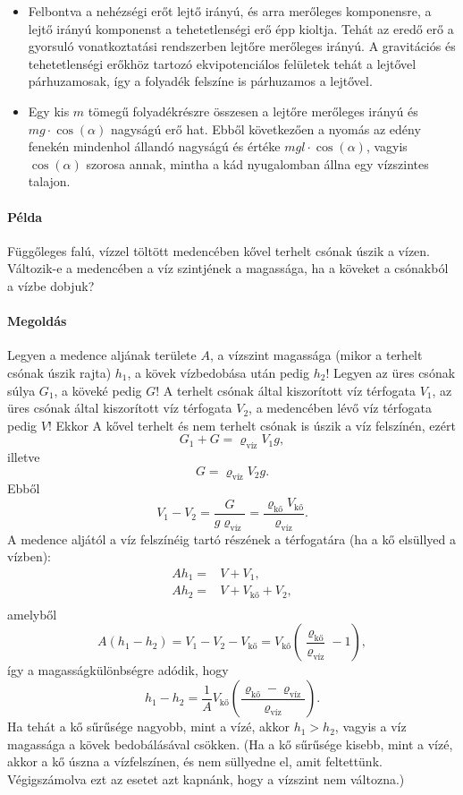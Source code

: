 \documentclass[12pt,a4paper]{scrartcl}
\begin{document}
\begin{itemize}
\item Felbontva a nehézségi erőt lejtő irányú, és arra merőleges komponensre, a lejtő irányú komponenst a tehetetlenségi erő épp kioltja. Tehát az eredő erő a gyorsuló vonatkoztatási rendszerben lejtőre merőleges irányú. A gravitációs és tehetetlenségi erőkhöz tartozó ekvipotenciálos felületek tehát a lejtővel párhuzamosak, így a folyadék felszíne is párhuzamos a lejtővel. 
\item Egy kis $m$ tömegű folyadékrészre összesen a lejtőre merőleges irányú és $mg \cdot \cos \left( \alpha  \right)$ nagyságú erő hat. Ebből következően a nyomás az edény fenekén mindenhol állandó nagyságú és értéke $mgl \cdot \cos \left( \alpha  \right)$, vagyis $\cos \left( \alpha  \right)$ szorosa annak, mintha a kád nyugalomban állna egy vízszintes talajon.
\end{itemize}

\paragraph{Példa}
Függőleges falú, vízzel töltött medencében kővel terhelt csónak úszik a vízen. Változik-e a medencében a víz szintjének a magassága, ha a köveket a csónakból a vízbe dobjuk?

\paragraph{Megoldás}
Legyen a medence aljának területe $A$, a vízszint magassága (mikor a terhelt csónak úszik rajta) $h_1$, a kövek vízbedobása után pedig $h_2$! Legyen az üres csónak súlya $G_1$, a köveké pedig $G$! A terhelt csónak által kiszorított víz térfogata $V_1$, az üres csónak által kiszorított víz térfogata $V_2$, a medencében lévő víz térfogata pedig $V$! Ekkor
A kővel terhelt és nem terhelt csónak is úszik a víz felszínén, ezért
\[{G_1} + G = {\varrho _{\text{víz}}}{V_1}g,\]
illetve
\[G = {\varrho _{\text{víz}}}{V_2}g.\]
Ebből
\[{V_1} - {V_2} = \frac{G}{{g{\varrho _{\text{víz}}}}} = \frac{{{\varrho _{\text{kő}}}{V_{\text{kő}}}}}{{{\varrho _{\text{víz}}}}}.\]
A medence aljától a víz felszínéig tartó részének a térfogatára (ha a kő elsüllyed a vízben):
\[\begin{aligned}
  A{h_1} =  & V + {V_1}, \\ 
  A{h_2} =  & V + {V_{{\text{kő}}}} + {V_2}, \\ 
\end{aligned} \]
amelyből
\[A\left( {{h_1} - {h_2}} \right) = {V_1} - {V_2} - {V_{{\text{kő}}}} = {V_{{\text{kő}}}}\left( {\frac{{{\varrho _{{\text{kő}}}}}}{{{\varrho _{{\text{víz}}}}}} - 1} \right),\]
így a magasságkülönbségre adódik, hogy
\[{h_1} - {h_2} = \frac{1}{A}{V_{{\text{kő}}}}\left( {\frac{{{\varrho _{{\text{kő}}}} - {\varrho _{{\text{víz}}}}}}{{{\varrho _{{\text{víz}}}}}}} \right).\]
Ha tehát a kő sűrűsége nagyobb, mint a vízé, akkor $h_1 > h_2$, vagyis a víz magassága a kövek bedobálásával csökken. (Ha a kő sűrűsége kisebb, mint a vízé, akkor a kő úszna a vízfelszínen, és nem süllyedne el, amit feltettünk. Végigszámolva ezt az esetet azt kapnánk, hogy a vízszint nem változna.)
\normalsize
\end{document}
